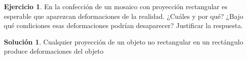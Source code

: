 \documentclass[a4paper, 11pt]{article}
\theoremstyle{definition}
\newtheorem{ejercicio}{Ejercicio}
\newtheorem*{solucion}{Solución}
\theoremstyle{theorem}
\begin{document}
  \begin{ejercicio}
      En la confección de un mosaico con proyección rectangular es esperable que aparezcan deformaciones de la realidad. ¿Cuáles y por qué? ¿Bajo qué condiciones esas deformaciones podrían desaparecer? Justificar la respuesta.
  \end{ejercicio}

  \begin{solucion}
      Cualquier proyección de un objeto no rectangular en un rectángulo produce deformaciones del objeto
  \end{solucion}
\end{document}
